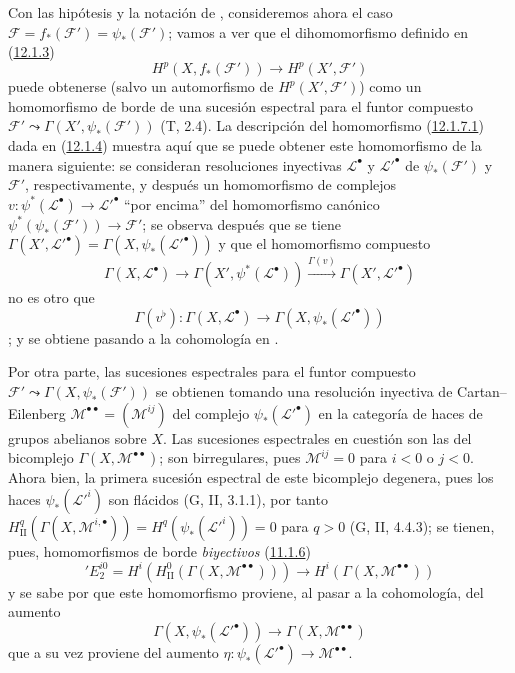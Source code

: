 \begin{env}[12.1.7]
\label{0.12.1.7}
\label{0.12.1.7-fr}
Con las hipótesis y la notación de , consideremos ahora el
caso
$\mathcal F=f_*(\mathcal F')=\psi_*(\mathcal F')$; vamos a ver que el dihomomorfismo definido en (\hyperref[0.12.1.3-fr]{12.1.3}) \[
\label{0.12.1.7.1-fr}
\tag{12.1.7.1}
H^p(X,f_*(\mathcal F'))\longrightarrow H^p(X',\mathcal F')
\]
puede obtenerse (salvo un automorfismo de $H^p(X',\mathcal F')$) como un
homomorfismo de borde de una sucesión espectral para el funtor compuesto
$\mathcal F'\leadsto\Gamma(X',\psi_*(\mathcal F'))$ (T, 2.4). La descripción del homomorfismo (\hyperref[0.12.1.7.1-fr]{12.1.7.1}) dada en (\hyperref[0.12.1.4-fr]{12.1.4}) muestra aquí que se puede obtener este homomorfismo de la manera siguiente: se consideran resoluciones inyectivas $\mathcal L^\bullet$ y
$\mathcal L'^\bullet$ de $\psi_*(\mathcal F')$ y $\mathcal F'$,
respectivamente, y después un homomorfismo de complejos
$v:\psi^*(\mathcal L^\bullet)\to\mathcal L'^\bullet$
``por encima'' del homomorfismo canónico
$\psi^*(\psi_*(\mathcal F'))\to\mathcal F'$;
se observa después que se tiene $\Gamma(X',\mathcal L'^\bullet)=\Gamma(X,\psi_*(\mathcal L'^\bullet))$
y que el homomorfismo compuesto
\[
\Gamma(X,\mathcal L^\bullet)\longrightarrow
\Gamma(X',\psi^*(\mathcal L^\bullet))
\xrightarrow{\Gamma(v)}\Gamma(X',\mathcal L'^\bullet)
\]
no es otro que
\[
\label{0.12.1.7.2-fr}
\tag{12.1.7.2}
\Gamma(v^\flat):\Gamma(X,\mathcal L^\bullet)
\longrightarrow\Gamma(X,\psi_*(\mathcal L'^\bullet))
\]
; y  se
obtiene pasando a la cohomología en .

Por otra parte, las sucesiones espectrales para el funtor compuesto
$\mathcal F'\leadsto\Gamma(X,\psi_*(\mathcal F'))$
se obtienen tomando una resolución inyectiva de Cartan--Eilenberg
$\mathcal M^{\bullet\bullet}=(\mathcal M^{ij})$
del complejo $\psi_*(\mathcal L'^\bullet)$ en la categoría de
haces de grupos abelianos sobre $X$.
Las sucesiones espectrales en cuestión son las del bicomplejo
$\Gamma(X,\mathcal M^{\bullet\bullet})$; son birregulares, pues
$\mathcal M^{ij}=0$ para $i<0$ o $j<0$.
Ahora bien, la primera sucesión espectral de este bicomplejo degenera, pues
los haces $\psi_*(\mathcal L'^i)$ son flácidos (G, II, 3.1.1), por tanto $H_{\mathrm{II}}^q(\Gamma(X,\mathcal M^{i,\bullet}))
=H^q(\psi_*(\mathcal L'^i))=0$ para $q>0$ (G, II, 4.4.3); se tienen, pues, homomorfismos de borde \emph{biyectivos} (\hyperref[0.11.1.6-fr]{11.1.6})
\[
\label{0.12.1.7.3-fr}
\tag{12.1.7.3}
'E_2^{i0}=H^i(H_{\mathrm{II}}^0(\Gamma(X,\mathcal M^{\bullet\bullet})))
\longrightarrow H^i(\Gamma(X,\mathcal M^{\bullet\bullet}))
\]
y se sabe por  que este homomorfismo proviene, al pasar
a la cohomología, del aumento
\[
\label{0.12.1.7.4-fr}
\tag{12.1.7.4}
\Gamma(X,\psi_*(\mathcal L'^\bullet))
\longrightarrow\Gamma(X,\mathcal M^{\bullet\bullet})
\]
que a su vez proviene del aumento
$\eta:\psi_*(\mathcal L'^\bullet)\to\mathcal M^{\bullet\bullet}$.


\end{env}
